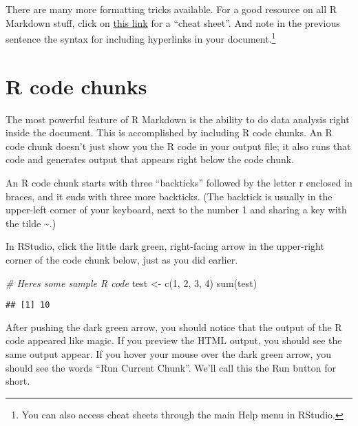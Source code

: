 \documentclass[
]{book}
\newenvironment{Shaded}{\begin{snugshade}}{\end{snugshade}}
\newcommand{\CommentTok}[1]{\textcolor[rgb]{0.56,0.35,0.01}{\textit{#1}}}
\newcommand{\DecValTok}[1]{\textcolor[rgb]{0.00,0.00,0.81}{#1}}
\newcommand{\FunctionTok}[1]{\textcolor[rgb]{0.00,0.00,0.00}{#1}}
\newcommand{\NormalTok}[1]{#1}
\newcommand{\OtherTok}[1]{\textcolor[rgb]{0.56,0.35,0.01}{#1}}
\begin{document}
There are many more formatting tricks available. For a good resource on all R Markdown stuff, click on \href{https://www.rstudio.com/wp-content/uploads/2015/03/rmarkdown-reference.pdf}{this link} for a ``cheat sheet''. And note in the previous sentence the syntax for including hyperlinks in your document.\footnote{You can also access cheat sheets through the main Help menu in RStudio.}

\hypertarget{rmark-codechunks}{%
\section{R code chunks}\label{rmark-codechunks}}

The most powerful feature of R Markdown is the ability to do data analysis right inside the document. This is accomplished by including R code chunks. An R code chunk doesn't just show you the R code in your output file; it also runs that code and generates output that appears right below the code chunk.

An R code chunk starts with three ``backticks'' followed by the letter r enclosed in braces, and it ends with three more backticks. (The backtick is usually in the upper-left corner of your keyboard, next to the number 1 and sharing a key with the tilde \textasciitilde.)

In RStudio, click the little dark green, right-facing arrow in the upper-right corner of the code chunk below, just as you did earlier.

\begin{Shaded}
\begin{Highlighting}[]
\CommentTok{\# Here\textquotesingle{}s some sample R code}
\NormalTok{test }\OtherTok{\textless{}{-}} \FunctionTok{c}\NormalTok{(}\DecValTok{1}\NormalTok{, }\DecValTok{2}\NormalTok{, }\DecValTok{3}\NormalTok{, }\DecValTok{4}\NormalTok{)}
\FunctionTok{sum}\NormalTok{(test)}
\end{Highlighting}
\end{Shaded}

\begin{verbatim}
## [1] 10
\end{verbatim}

After pushing the dark green arrow, you should notice that the output of the R code appeared like magic. If you preview the HTML output, you should see the same output appear. If you hover your mouse over the dark green arrow, you should see the words ``Run Current Chunk''. We'll call this the Run button for short.
\end{document}
